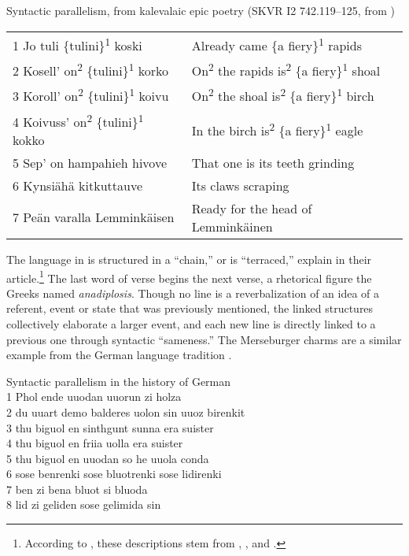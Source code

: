 \ea%
\label{ex:6:27}Syntactic parallelism, from kalevalaic epic poetry (SKVR I2 742.119--125, from \citealt[448]{Frog2017})\medskip\\
\begin{tabular}{@{}ll@{}}
1  Jo tuli \{tulini\}\textsuperscript{1} koski                         &      Already came \{a fiery\}\textsuperscript{1} rapids                                           \\
2  Kosell’ on\textsuperscript{2} \{tulini\}\textsuperscript{1} korko   &    On\textsuperscript{2} the rapids is\textsuperscript{2} \{a fiery\}\textsuperscript{1} shoal    \\
3  Koroll’ on\textsuperscript{2} \{tulini\}\textsuperscript{1} koivu   &    On\textsuperscript{2} the shoal is\textsuperscript{2} \{a fiery\}\textsuperscript{1} birch     \\
4  Koivuss’ on\textsuperscript{2} \{tulini\}\textsuperscript{1} kokko  &   In the birch is\textsuperscript{2} \{a fiery\}\textsuperscript{1} eagle                         \\
5  Sep’ on hampahieh hivove    & That one is its teeth grinding         \\
6  Kynsiähä kitkuttauve        & Its claws scraping                     \\
7  Peän varalla Lemminkäisen   &  Ready for the head of Lemminkäinen    \\
\end{tabular}
\z

\noindent The language in  is structured in a “chain,” or is “terraced,”  \citet[212]{FrogTarkka2017} explain in their article.\footnote{{According to \citet[212]{FrogTarkka2017}, these descriptions stem from \citet[I: 79]{Krohn1918}, \citet[120--122]{Steinitz1934}, and \citet[63--69]{Austerlitz1958}.} } The last word of verse begins the next verse, a rhetorical figure the Greeks named \textit{anadiplosis}. Though no line is a reverbalization of an idea of a referent, event or state that was previously mentioned, the linked structures collectively elaborate a larger event, and each new line is directly linked to a previous one through syntactic “sameness.” The Merseburger charms are a similar example from the German language tradition .

\ea%
    \label{ex:6:28}
         Syntactic parallelism in the history of German\\
1  Phol ende uuodan  \qquad   uuorun zi holza\\
2  du uuart demo balderes uolon  \qquad   sin uuoz birenkit\\
3  thu biguol en sinthgunt  \qquad   sunna era suister\\
4  thu biguol en friia  \qquad   uolla era suister\\
5  thu biguol en uuodan  \qquad   so he uuola conda\\
6  sose benrenki sose bluotrenki  \qquad   sose lidirenki\\
7  ben zi bena  \qquad   bluot si bluoda\\
8  lid zi geliden  \qquad   sose gelimida sin\medskip

